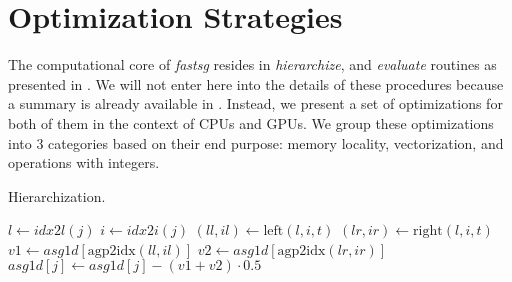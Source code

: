 \section{Optimization Strategies}

The computational core of \textit{fastsg} resides in \textit{hierarchize}, and
\textit{evaluate} routines as presented in \cite{}. We will not enter here into
the details of these procedures because a summary is already available in
\cite{murarasu2011}. Instead, we present a set of optimizations for both of them
in the context of CPUs and GPUs. We group these optimizations into 3 categories
based on their end purpose: memory locality, vectorization, and operations with
integers.

\begin{algorithm}[tbp]
\small{
	\caption{Hierarchization.}
 	\label{alg:hierarchization}                       

 	\begin{algorithmic}[1]
 				\State {}
 			\EndFor
 		\EndFor
	\end{algorithmic}
 
	\begin{algorithmic}[1]
	 				\State $l \leftarrow idx2l(j)$
	 			\EndIf
	 			\State $i \leftarrow idx2i(j)$
	 			\State $(\textit{ll}, \textit{il}) \leftarrow \text{left}(l, i, t)$
	 			\State $(\textit{lr}, \textit{ir}) \leftarrow \text{right}(l, i, t)$
	 			\State $\textit{v1} \leftarrow \textit{asg1d}[\text{agp2idx}(\textit{ll},
	 			\textit{il})]$ \State $\textit{v2} \leftarrow
	 			\textit{asg1d}[\text{agp2idx}(\textit{lr}, \textit{ir})]$ \State$\textit{asg1d}[j] \leftarrow \textit{asg1d}[j] - (\textit{v1} +\textit{v2}) \cdot 0.5$
			\EndFor
		\EndProcedure
	\end{algorithmic}
}
\end{algorithm}

